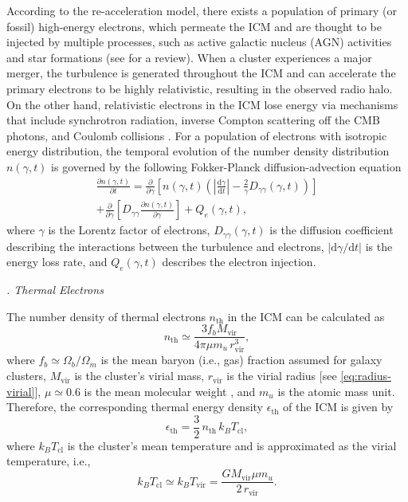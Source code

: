 \documentclass[twocolumn]{aastex62}
\newcommand{\R}[1]{\mathrm{#1}}
\newcommand{\D}[1]{\R{d} #1}
\newcommand{\diff}[2]{\frac{\D{#1}}{\D{#2}}}
\newcommand{\pdiff}[2]{\frac{\partial #1}{\partial #2}}
\newcommand{\editone}[1]{{\leavevmode\color{cyan}#1}}
\newcounter{sssseccount}
\newcommand{\sssseclabel}{\alph{sssseccount}}
\newcommand{\ssssec}[1]{%
  \vspace{1ex}%
  \stepcounter{sssseccount}%
  \noindent\emph{\sssseclabel. #1}%
}
\begin{document}
According to the re-acceleration model, there exists a population of
primary (or fossil) high-energy electrons, which permeate the ICM and
are thought to be injected by multiple processes, such as active
galactic nucleus (AGN) activities and star formations
(see \citealt{blasi2007rev} for a review).
When a cluster experiences a major merger, the turbulence is generated
throughout the ICM and can accelerate the primary electrons to be highly
relativistic, resulting in the observed radio halo.
On the other hand, relativistic electrons in the ICM lose energy via
mechanisms that include synchrotron radiation, inverse Compton scattering
off the CMB photons, and Coulomb collisions \citep{sarazin1999}.
For a population of electrons with isotropic energy distribution, the
temporal evolution of the number density distribution $n(\gamma, t)$
is governed by the following Fokker-Planck diffusion-advection equation
\citep{eilek1991,schlickeiser2002}
\begin{multline}
  \label{eq:fokkerplanck}
  \pdiff{n(\gamma,t)}{t} = \pdiff{}{\gamma} \left[ n(\gamma,t) \left(
      \left| \diff{\gamma}{t} \right| -
      \frac{2}{\gamma} D_{\gamma\gamma}(\gamma, t) \right) \right] \\
    + \pdiff{}{\gamma} \left[ D_{\gamma\gamma} \pdiff{n(\gamma,t)}{\gamma}
    \right] + Q_e(\gamma,t),
\end{multline}
where $\gamma$ is the Lorentz factor of electrons,
$D_{\gamma\gamma}(\gamma, t)$ is the diffusion coefficient describing
the interactions between the turbulence and electrons,
$|\R{d}\gamma / \R{d}t|$ is the energy loss rate,
and $Q_e(\gamma, t)$ describes the electron injection.

\setcounter{sssseccount}{0}
\ssssec{Thermal Electrons}

The number density of thermal electrons $n_{\R{th}}$ in the ICM can be
calculated as
\begin{equation}
  \label{eq:n-th}
  n_{\R{th}} \simeq \frac{3 f_b M_{\R{vir}}}{4\pi \mu m_u \,r^3_{\R{vir}}},
\end{equation}
where
$f_b \simeq \Omega_b/\Omega_m$ is the mean baryon (i.e., gas) fraction
assumed for galaxy clusters,
$M_{\R{vir}}$ is the cluster's virial mass,
$r_{\R{vir}}$ is the virial radius [see \autoref{eq:radius-virial}],
$\mu \simeq 0.6$ is the mean molecular weight \citep[e.g.,][]{ettori2013},
and $m_u$ is the atomic mass unit.
Therefore, the corresponding thermal energy density $\epsilon_{\R{th}}$
of the ICM is given by
\begin{equation}
  \label{eq:e-th}
  \epsilon_{\R{th}} = \frac{3}{2} \,n_{\R{th}} \,k_B T_{\R{cl}},
\end{equation}
where
\editone{$k_B T_{\R{cl}}$ is the cluster's mean temperature and is
approximated as the virial temperature, i.e.,
\begin{equation}
  \label{eq:kt}
  k_B T_{\R{cl}} \simeq k_B T_{\R{vir}}
    = \frac{G M_{\R{vir}} \mu m_u}{2 \,r_{\R{vir}}} .
\end{equation}
} %
\end{document}
